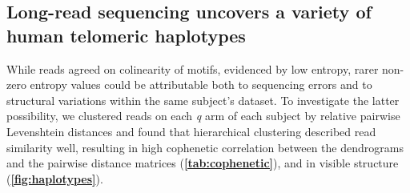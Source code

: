 \documentclass{article}
\begin{document}
\subsection*{Long-read sequencing uncovers a variety of human telomeric haplotypes}
    While reads agreed on colinearity of motifs, evidenced by low entropy,
        rarer non-zero entropy values could be attributable both to sequencing errors
        and to structural variations within the same subject's dataset.
    To investigate the latter possibility,
        we clustered reads on each \textit{q} arm of each subject by relative pairwise Levenshtein distances \cite{levenshtein}
        and found that hierarchical clustering described read similarity well,
            resulting in high cophenetic correlation between the dendrograms and the pairwise distance matrices
                (\textbf{\autoref{tab:cophenetic}}),
            and in visible structure (\textbf{\autoref{fig:haplotypes}}).
\end{document}

